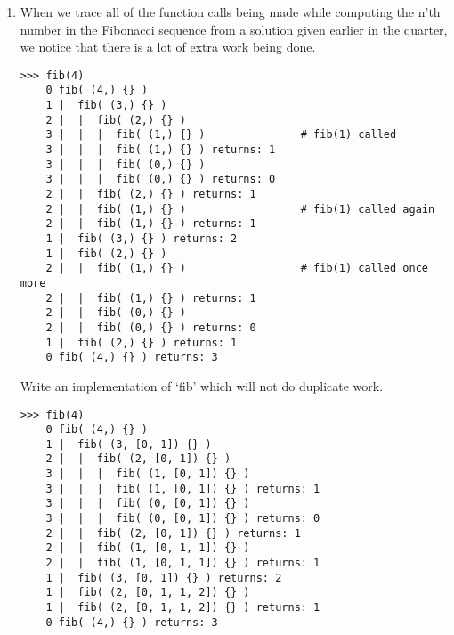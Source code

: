 \documentclass[11pt]{article}
\newenvironment{answer}{\large\lstset{basicstyle=\large}\color{white}}{}
\newenvironment{answer}{\large\lstset{basicstyle=\large}\color{red}}{}
\begin{document}
\begin{enumerate}
\item When we trace all of the function calls being made while computing the
      n'th number in the Fibonacci sequence from a solution given earlier in
      the quarter, we notice that there is a lot of extra work being done.

      

\begin{verbatim}
>>> fib(4)
    0 fib( (4,) {} )
    1 |  fib( (3,) {} )
    2 |  |  fib( (2,) {} )
    3 |  |  |  fib( (1,) {} )               # fib(1) called
    3 |  |  |  fib( (1,) {} ) returns: 1
    3 |  |  |  fib( (0,) {} )
    3 |  |  |  fib( (0,) {} ) returns: 0
    2 |  |  fib( (2,) {} ) returns: 1
    2 |  |  fib( (1,) {} )                  # fib(1) called again
    2 |  |  fib( (1,) {} ) returns: 1
    1 |  fib( (3,) {} ) returns: 2
    1 |  fib( (2,) {} )
    2 |  |  fib( (1,) {} )                  # fib(1) called once more
    2 |  |  fib( (1,) {} ) returns: 1
    2 |  |  fib( (0,) {} )
    2 |  |  fib( (0,) {} ) returns: 0
    1 |  fib( (2,) {} ) returns: 1
    0 fib( (4,) {} ) returns: 3
\end{verbatim}

      Write an implementation of `fib' which will not do duplicate work.

    \begin{answer}
    
\begin{verbatim}
>>> fib(4)
    0 fib( (4,) {} )
    1 |  fib( (3, [0, 1]) {} )
    2 |  |  fib( (2, [0, 1]) {} )
    3 |  |  |  fib( (1, [0, 1]) {} )
    3 |  |  |  fib( (1, [0, 1]) {} ) returns: 1
    3 |  |  |  fib( (0, [0, 1]) {} )
    3 |  |  |  fib( (0, [0, 1]) {} ) returns: 0
    2 |  |  fib( (2, [0, 1]) {} ) returns: 1
    2 |  |  fib( (1, [0, 1, 1]) {} )
    2 |  |  fib( (1, [0, 1, 1]) {} ) returns: 1
    1 |  fib( (3, [0, 1]) {} ) returns: 2
    1 |  fib( (2, [0, 1, 1, 2]) {} )
    1 |  fib( (2, [0, 1, 1, 2]) {} ) returns: 1
    0 fib( (4,) {} ) returns: 3
\end{verbatim}
    \end{answer}

\end{enumerate}
\end{document}
